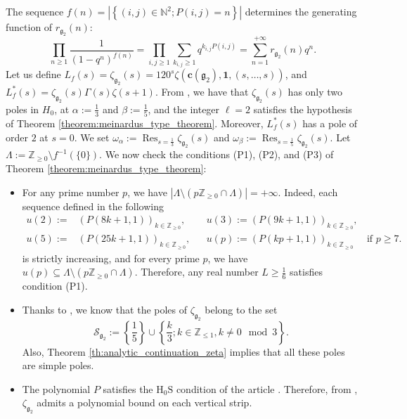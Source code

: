 \documentclass[a4paper]{amsart}
\theoremstyle{remark}
\theoremstyle{definition}
\DeclareMathOperator{\res}{Res}
\begin{document}
The sequence $f(n) = \left| \left\{ (i,j) \in {\mathbb{N}}^2; P(i,j)=n \right\} \right|$ determines the generating function of $r_{\mathfrak{g}_2}(n)$:
$$ \prod_{n \geq 1} \frac{1}{(1-q^n)^{f(n)}} = \prod_{i,j \geq 1} \sum_{k_{i,j} \geq 1} q^{k_{i,j} P(i,j)} = \sum_{n=1}^{+\infty} r_{\mathfrak{g}_2}(n) q^n. $$
Let us define $L_f(s) = \zeta_{\mathfrak{g}_2}(s)=120^s\zeta(\mathbf{c}(\mathfrak{g}_2),\mathbf{1},(s,\ldots,s))$, and $L_f^*(s) = \zeta_{\mathfrak{g}_2}(s) \Gamma(s) \zeta(s+1)$. From \cite[Theorem 3.1]{komori2011witten}, we have that $\zeta_{\mathfrak{g}_2}(s)$ has only two poles in $H_0$, at $\alpha:=\frac{1}{3}$ and $\beta:=\frac{1}{5}$, and the integer $\ell=2$ satisfies the hypothesis of Theorem \ref{theorem:meinardus_type_theorem}. Moreover, $L_f^*(s)$ has a pole of order $2$ at $s=0$. We set $\omega_{\alpha} := \res_{s=\frac{1}{3}}\zeta_{\mathfrak{g}_2}(s)$ and $\omega_{\beta} := \res_{s=\frac{1}{5}} \zeta_{\mathfrak{g}_2}(s)$. Let $\Lambda := \mathbb{Z}_{\geq 0} \setminus f^{-1}(\{ 0 \})$. We now check the conditions (P1), (P2), and (P3) of Theorem \ref{theorem:meinardus_type_theorem}:
\begin{itemize}
\item[(P1)] For any prime number $p$, we have $\left|\Lambda \setminus (p \mathbb{Z}_{\geq 0} \cap \Lambda)\right|=+\infty$. Indeed, each sequence defined in the following
\begin{align*}
    u(2) :=& (P(8k+1,1))_{k \in \mathbb{Z}_{\geq 0}}, && u(3) := (P(9k+1,1))_{k \in \mathbb{Z}_{\geq 0}}, \\
    u(5) :=& (P(25k+1,1))_{k \in \mathbb{Z}_{\geq 0}}, && u(p) := (P(kp+1,1))_{k \in \mathbb{Z}_{\geq 0}} \quad \text{ if } p \geq 7.
\end{align*}
is strictly increasing, and for every prime $p$, we have $u(p) \subseteq \Lambda \setminus (p \mathbb{Z}_{\geq 0} \cap \Lambda)$. Therefore, any real number $L \geq \frac{1}{6}$ satisfies condition (P1).
\item[(P2)] Thanks to \cite[Theorem 3.1]{komori2011witten}, we know that the poles of $\zeta_{\mathfrak{g}_2}$ belong to the set 
$$ \mathcal{S}_{\mathfrak{g}_2} := \left\{ \frac{1}{5} \right\} \cup \left\{ \frac{k}{3}; k \in \mathbb{Z}_{\leq 1}, k \neq 0 \mod 3 \right\}. $$ 
Also, Theorem \ref{th:analytic_continuation_zeta} implies that all these poles are simple poles.
\item[(P3)] The polynomial $P$ satisfies the $\mathrm{H_0S}$ condition of the article \cite{essouabri97singularitedirichlet}. Therefore, from \cite[Theorem 3]{essouabri97singularitedirichlet}, $\zeta_{\mathfrak{g}_2}$ admits a polynomial bound on each vertical strip.
\end{itemize}
\end{document}
